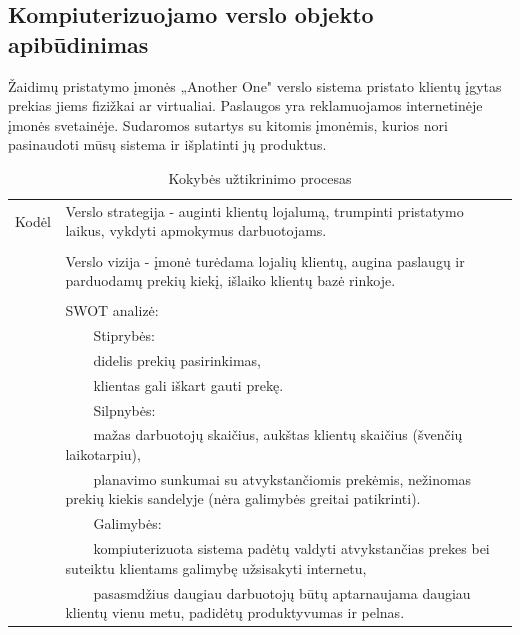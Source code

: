 \documentclass{VUMIFPSkursinis}
\newcommand{\tabitem}{~~\llap{\textbullet}~~}
\newcommand{\tabitemd}{~~\llap{\textopenbullet}~~}
\begin{document}
\subsection{Kompiuterizuojamo verslo objekto apibūdinimas}
Žaidimų pristatymo įmonės „Another One" verslo sistema pristato klientų įgytas prekias jiems fizižkai ar virtualiai. Paslaugos yra reklamuojamos internetinėje įmonės svetainėje. Sudaromos sutartys su kitomis įmonėmis, kurios nori pasinaudoti mūsų sistema ir išplatinti jų produktus.
\begin{center}
\begin{table}[ht]
\centering
	\caption{Kokybės užtikrinimo procesas}
	\begin{tabular}{| p{0.1\linewidth} | p{0.9\linewidth }|} 
	\hline
	Kodėl  & Verslo strategija - auginti klientų lojalumą, trumpinti pristatymo laikus, vykdyti apmokymus darbuotojams.\\ 
		&\\
		& Verslo vizija - įmonė turėdama lojalių klientų, augina paslaugų ir parduodamų prekių kiekį, išlaiko klientų bazė rinkoje. \\
		&\\
		& SWOT analizė: \\
		&\hspace{4mm}\tabitem Stiprybės: \\ 
		&\hspace{8mm}\tabitemd didelis prekių pasirinkimas, \\
		&\hspace{8mm}\tabitemd klientas gali iškart gauti prekę. \\
		&\hspace{4mm}\tabitem Silpnybės: \\
		&\hspace{8mm}\tabitemd mažas darbuotojų skaičius, aukštas klientų skaičius (švenčių laikotarpiu), \\
		&\hspace{8mm}\tabitemd planavimo sunkumai su atvykstančiomis prekėmis, nežinomas prekių kiekis sandelyje (nėra galimybės greitai patikrinti). \\
		&\hspace{4mm}\tabitem Galimybės: \\
		&\hspace{8mm}\tabitemd kompiuterizuota sistema padėtų valdyti atvykstančias prekes bei suteiktu klientams galimybę užsisakyti internetu, \\
		&\hspace{8mm}\tabitemd pasasmdžius daugiau darbuotojų būtų aptarnaujama daugiau klientų vienu metu, padidėtų produktyvumas ir pelnas. \\

\end{tabular}
\end{table}
\end{center}
\end{document}
